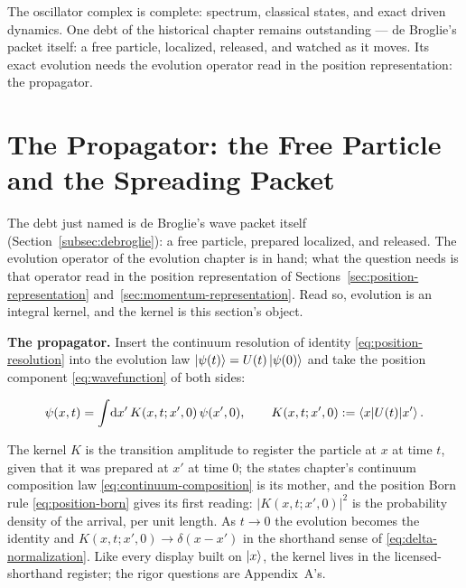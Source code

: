 The oscillator complex is complete: spectrum, classical states, and exact driven dynamics. One debt of the historical chapter remains outstanding --- de Broglie's packet itself: a free particle, localized, released, and watched as it moves. Its exact evolution needs the evolution operator read in the position representation: the propagator.

\section{The Propagator: the Free Particle and the Spreading Packet}
\label{sec:propagator}

The debt just named is de Broglie's wave packet itself (Section~\ref{subsec:debroglie}): a free particle, prepared localized, and released. The evolution operator of the evolution chapter is in hand; what the question needs is that operator read in the position representation of Sections~\ref{sec:position-representation} and~\ref{sec:momentum-representation}. Read so, evolution is an integral kernel, and the kernel is this section's object.

\medskip\noindent\textbf{The propagator.} Insert the continuum resolution of identity \eqref{eq:position-resolution} into the evolution law $\ket{\psi(t)} = U(t)\ket{\psi(0)}$ and take the position component \eqref{eq:wavefunction} of both sides:
\begin{linenomath}
    \begin{equation}
        \psi(x, t) = \int\!\mathrm{d} x'\,K(x, t; x', 0)\,\psi(x', 0),
        \qquad
        K(x, t; x', 0) := \braket{x|U(t)|x'} .
        \label{eq:propagator-def}
    \end{equation}
\end{linenomath}
The kernel $K$ is the transition amplitude to register the particle at $x$ at time $t$, given that it was prepared at $x'$ at time $0$; the states chapter's continuum composition law \eqref{eq:continuum-composition} is its mother, and the position Born rule \eqref{eq:position-born} gives its first reading: $|K(x, t; x', 0)|^2$ is the probability density of the arrival, per unit length. As $t \to 0$ the evolution becomes the identity and $K(x, t; x', 0) \to \delta(x - x')$ in the shorthand sense of \eqref{eq:delta-normalization}. Like every display built on $\ket{x}$, the kernel lives in the licensed-shorthand register; the rigor questions are Appendix~A's.

